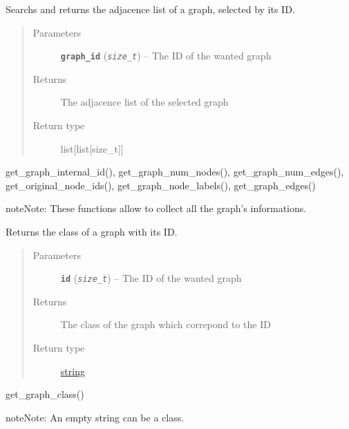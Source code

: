 \documentclass[letterpaper,10pt,english]{sphinxmanual}
\begin{document}
\begin{fulllineitems}
\label{doc:gedlibpy.get_graph_adjacence_matrix}
Searchs and returns the adjacence list of a graph, selected by its ID.
\begin{quote}\begin{description}
\item[{Parameters}] \leavevmode
\textbf{\texttt{graph\_id}} (\emph{\texttt{size\_t}}) -- The ID of the wanted graph

\item[{Returns}] \leavevmode
The adjacence list of the selected graph

\item[{Return type}] \leavevmode
list{[}list{[}size\_t{]}{]}

\end{description}\end{quote}




get\_graph\_internal\_id(), get\_graph\_num\_nodes(), get\_graph\_num\_edges(), get\_original\_node\_ids(), get\_graph\_node\_labels(), get\_graph\_edges()



\begin{notice}{note}{Note:}
These functions allow to collect all the graph's informations.
\end{notice}

\end{fulllineitems}


\begin{fulllineitems}
\label{doc:gedlibpy.get_graph_class}
Returns the class of a graph with its ID.
\begin{quote}\begin{description}
\item[{Parameters}] \leavevmode
\textbf{\texttt{id}} (\emph{\texttt{size\_t}}) -- The ID of the wanted graph

\item[{Returns}] \leavevmode
The class of the graph which correpond to the ID

\item[{Return type}] \leavevmode
\href{https://docs.python.org/3/library/string.html\#module-string}{string}

\end{description}\end{quote}




get\_graph\_class()



\begin{notice}{note}{Note:}
An empty string can be a class.
\end{notice}

\end{fulllineitems}
\end{document}
